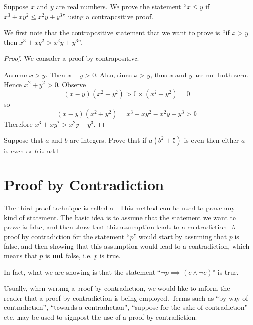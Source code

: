 \begin{example}
    \setlength{\parindent}{1.5em}

    Suppose $x$ and $y$ are real numbers. We prove the statement ``$x \leq y$ if $x^3 + xy^2 \leq x^2y + y^3$'' using a contrapositive proof.

    We first note that the contrapositive statement that we want to prove is ``if $x > y$ then $x^3 + xy^2 > x^2y + y^3$''.

    \begin{proof}
        We consider a proof by contrapositive.

        Assume $x > y$. Then $x - y > 0$. Also, since $x > y$, thus $x$ and $y$ are not both zero. Hence $x^2 + y^2 > 0$.
        Observe
        \[
            (x-y)(x^2+y^2) > 0 \times (x^2+y^2) = 0
        \]
        so
        \[
            (x-y)(x^2+y^2) = x^3 + xy^2 - x^2y - y^3 > 0
        \]
        Therefore $x^3 + xy^2 > x^2y + y^3$.
    \end{proof}
\end{example}

\begin{exercise}
    Suppose that $a$ and $b$ are integers. Prove that if $a(b^2 + 5)$ is even then either $a$ is even or $b$ is odd.
\end{exercise}

\section{Proof by Contradiction}
The third proof technique is called a . This method can be used to prove any kind of statement. The basic idea is to assume that the statement we want to prove is false, and then show that this assumption leads to a contradiction. A proof by contradiction for the statement ``$p$'' would start by assuming that $p$ is false, and then showing that this assumption would lead to a contradiction, which means that $p$ is \textbf{not} false, i.e. $p$ is true.

\begin{remark}
    In fact, what we are showing is that the statement ``$\lnot p \implies (c \land \lnot c)$'' is true.
\end{remark}

Usually, when writing a proof by contradiction, we would like to inform the reader that a proof by contradiction is being employed. Terms such as ``by way of contradiction'', ``towards a contradiction'', ``suppose for the sake of contradiction'' etc. may be used to signpost the use of a proof by contradiction.

